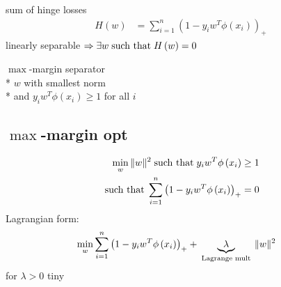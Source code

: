 \documentclass{article}
\begin{document}
sum of hinge losses
\begin{align*}
H\left(w\right)  &= \displaystyle\sum_{i=1}^{n} \left(1 - y_{i} w^{T} \phi\left(x_{i}\right)\right)_{+}
\end{align*}
linearly separable $\Rightarrow  \exists w \text{\;such that\;} H\left(w\right) = 0$

$\displaystyle\max$-margin separator
\\* $w $ with smallest norm
\\* and $y_{i} w^{T} \phi\left(x_{i}\right) \geq  1$ for all $i $



\subsection{$\displaystyle\max$-margin opt}
\begin{align*}
\displaystyle\min_{w} \| w \|^{2} \text{\;such that\;} y_{i} w^{T} \phi\left(x_{i}\right) &\geq  1
\\ \text{\;such that\;} \displaystyle\sum_{i=1}^{n} \left(1 - y_{i} w^{T} \phi\left(x_{i}\right)\right)_{+} &= 0
\end{align*}
Lagrangian form:
\begin{align*}
&\displaystyle\min_{w} \displaystyle\sum_{i=1}^{n} \left(1 - y_{i} w^{T} \phi\left(x_{i}\right)\right)_{+} + \underbrace{\lambda}_{\text{\;Lagrange mult\;}} \| w \|^{2}
\end{align*}
for $\lambda > 0$ tiny
\end{document}
